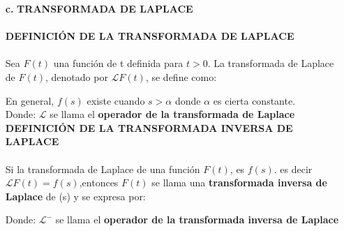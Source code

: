 \documentclass[11pt,a4paper]{article}
\begin{document}
{{\begin{enumerate}
\begin{itemize}
\end{itemize}

De igual manera se puede demostrar algunas propiedades como

\begin{itemize}

    \item $\mathcal{Z}\{C_1f_1[n]+C_2f_2[n]\}=C_1\mathcal{Z}\{f_1[n]\}+C_2\mathcal{Z}\{f_2[n]\}=C_1F_1(z)+C_2F_2(z)$\\
    \item $\mathcal{Z}\{f[n-k]\}=\frac{\mathcal{Z}\{f[n]\}}{z^k}=\frac{F(z)}{z^n}$
  
\end{itemize}
	
	\newpage
	\item[\textbf{c.}]
	\textbf{TRANSFORMADA DE LAPLACE}\\\\
	\textbf{DEFINICIÓN DE LA TRANSFORMADA DE LAPLACE}\\\\
	Sea $F(t)$ una función de t definida para $t>0$. La transformada de Laplace de $F(t)$, denotado por $\mathcal{L}{F(t)}$, se define como:
	\begin{center}
	\end{center}
	En general, $f(s)$ existe cuando $s > \alpha$ donde $\alpha$ es cierta constante.\\
	Donde: $\mathcal{L}$ se llama el \textbf{operador de la transformada de Laplace}\\
	
	\textbf{DEFINICIÓN DE LA TRANSFORMADA INVERSA DE LAPLACE}\\\\
	Si la transformada de Laplace de una función $F(t)$, es $f(s)$. es decir $\mathcal{L}{F(t)}=f(s)$,entonces $F(t)$ se llama una \textbf{transformada inversa de Laplace} de (s) y se expresa por:
	\begin{center}
	\end{center}
	Donde: $\mathcal{L^{-}}$ se llama el \textbf{operador de la transformada inversa de Laplace}
	\end{enumerate}
	}}
\newpage
\end{document}
